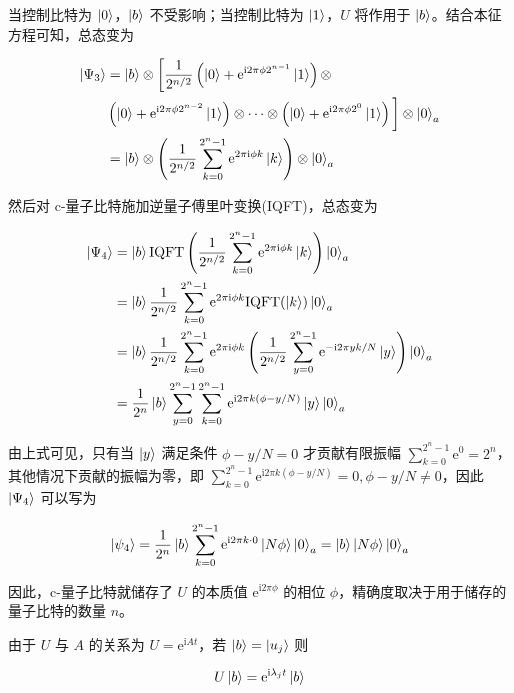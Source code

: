 \documentclass[aps,prl,twocolumn,groupedaddress]{revtex4-2}
\begin{document}
当控制比特为 $\ket{0}$，$\ket{b}$ 不受影响；当控制比特为 $\ket{1}$，$U$ 将作用于 $\ket{b}$。结合本征方程可知，总态变为

$$
\begin{aligned}
\ket{\Psi_3}
&=\ket{b}\otimes \bigg[\frac{1 }{2^{n/2} } \left(\ket{0}+\mathrm{e}^{\mathrm{i}2\pi \phi 2^{n-1}}\ket{1} \right)\otimes \\
&\left(\ket{0}+\mathrm{e}^{\mathrm{i}2\pi \phi 2^{n-2}}\ket{1} \right)\otimes \cdots \otimes \left(\ket{0}+\mathrm{e}^{\mathrm{i}2\pi \phi 2^0}\ket{1} \right) \bigg]\otimes\ket{0}_a \\
&=\ket{b} \otimes \left(\frac{1 }{2^{n/2} } \sum_{k=0}^{2^n-1} \mathrm{e}^{2\pi\mathrm{i}\phi k} \ket{k} \right)\otimes \ket{0}_a
\end{aligned}
$$

然后对 c-量子比特施加逆量子傅里叶变换(IQFT)，总态变为

$$
\begin{aligned}
\ket{\Psi_4}
&=\ket{b}\mathrm{IQFT}\left(\frac{1 }{2^{n/2} } \sum_{k=0}^{2^n-1} \mathrm{e}^{2\pi\mathrm{i}\phi k} \ket{k} \right) \ket{0}_a \\
&=\ket{b}\frac{1 }{2^{n/2} } \sum_{k=0}^{2^n-1} \mathrm{e}^{2\pi\mathrm{i}\phi k} \mathrm{IQFT}(\ket{k}) \ket{0}_a \\
&=\ket{b}\frac{1 }{2^{n/2} } \sum_{k=0}^{2^n-1} \mathrm{e}^{2\pi\mathrm{i}\phi k} \left(\frac{1 }{2^{n/2} } \sum_{y=0}^{2^n-1} \mathrm{e}^{-\mathrm{i}2\pi yk/N} \ket{y} \right) \ket{0}_a \\
&=\frac{1 }{2^n } \ket{b} \sum_{y=0}^{2^n-1}\sum_{k=0}^{2^n-1}\mathrm{e}^{\mathrm{i}2\pi k(\phi-y/N)}\ket{y}\ket{0}_a
\end{aligned}
$$

由上式可见，只有当 $\ket{y}$ 满足条件 $\phi-y/N=0$ 才贡献有限振幅 $\displaystyle{\sum_{k=0}^{2^n-1} \mathrm{e}^0 = 2^n }$，其他情况下贡献的振幅为零，即 $\displaystyle{\sum_{k=0}^{2^n-1}\mathrm{e}^{\mathrm{i}2\pi k (\phi-y/N)}=0,\phi-y/N\ne 0 }$，因此 $\ket{\Psi_4}$ 可以写为

$$
\ket{\psi_4}
=\frac{1 }{2^n } \ket{b} \sum_{k=0}^{2^n-1} \mathrm{e}^{\mathrm{i}2\pi k\cdot 0} \ket{N\phi}\ket{0}_a
=\ket{b}\ket{N\phi}\ket{0}_a
$$

因此，c-量子比特就储存了 $U$ 的本质值 $\mathrm{e}^{\mathrm{i}2\pi \phi} $ 的相位 $\phi$，精确度取决于用于储存的量子比特的数量 $n$。

由于 $U$ 与 $A$ 的关系为 $U = \mathrm{e}^{\mathrm{i}At}$，若 $\ket{b}=\ket{u_j}$ 则

$$
U\ket{b} = \mathrm{e}^{\mathrm{i}\lambda_j t} \ket{b}
$$
\end{document}
